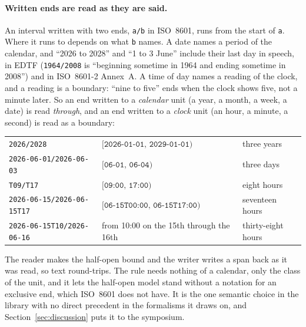 \paragraph*{Written ends are read as they are said.} An interval
written with two ends, \texttt{a/b} in ISO~8601, runs from the start
of \texttt{a}. Where it runs to depends on what \texttt{b} names. A
date names a period of the calendar, and ``2026 to 2028'' and ``1 to
3 June'' include their last day in speech, in EDTF (\texttt{1964/2008}
is ``beginning sometime in 1964 and ending sometime in 2008'') and in
ISO~8601-2 Annex~A. A time of day names a reading of the clock, and a
reading is a boundary: ``nine to five'' ends when the clock shows five,
not a minute later. So an end written to a \emph{calendar} unit (a
year, a month, a week, a date) is read \emph{through}, and an end
written to a \emph{clock} unit (an hour, a minute, a second) is read
as a boundary:
\begin{center}
\begin{tabular}{lll}
  \texttt{2026/2028}                     & $[\texttt{2026-01-01},\, \texttt{2029-01-01})$ & three years \\
  \texttt{2026-06-01/2026-06-03}         & $[\texttt{06-01},\, \texttt{06-04})$            & three days \\
  \texttt{T09/T17}                       & $[\texttt{09:00},\, \texttt{17:00})$            & eight hours \\
  \texttt{2026-06-15/2026-06-15T17}      & $[\texttt{06-15T00:00},\, \texttt{06-15T17:00})$ & seventeen hours \\
  \texttt{2026-06-15T10/2026-06-16}      & from 10:00 on the 15th through the 16th & thirty-eight hours \\
\end{tabular}
\end{center}
The reader makes the half-open bound and the writer writes a span back
as it was read, so text round-trips. The rule needs nothing of a
calendar, only the class of the unit, and it lets the half-open model
stand without a notation for an exclusive end, which ISO~8601 does not
have. It is the one semantic choice in the library with no direct
precedent in the formalisms it draws on, and Section~\ref{sec:discussion}
puts it to the symposium.


